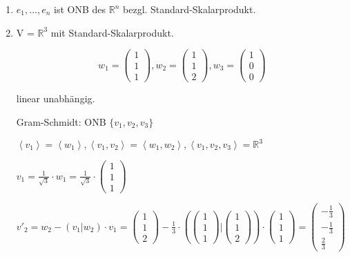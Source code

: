 \documentclass[a4paper, openany]{book}
\begin{document}
        \begin{enumerate}[label=(\alph*)]
          \item $e_1, ..., e_n$ ist ONB des $\mathbb{R}^n$ bezgl. Standard-Skalarprodukt.

          \item V = $\mathbb{R}^3$ mit Standard-Skalarprodukt.

          \[ w_1 = \begin{pmatrix}1 \\ 1 \\ 1 \end{pmatrix}, w_2 = \begin{pmatrix}1 \\ 1 \\ 2 \end{pmatrix}, w_3 = \begin{pmatrix}1 \\ 0 \\ 0 \end{pmatrix} \]

          linear unabhängig.

          Gram-Schmidt: ONB $\{v_1, v_2, v_3 \}$

          $\left \langle v_1 \right \rangle = \left \langle w_1 \right \rangle, \left \langle v_1, v_2 \right \rangle = \left \langle w_1, w_2 \right \rangle, \left \langle v_1, v_2, v_3 \right \rangle = \mathbb{R}^3$

          \par \medskip

          $v_1 = \frac{1}{\sqrt{3}} \cdot w_1 = \frac{1}{\sqrt{3}} \cdot \begin{pmatrix}1 \\ 1 \\ 1 \end{pmatrix}$

          \par \medskip

          $v'_2 = w_2 - (v_1 | w_2) \cdot v_1 = \begin{pmatrix}1 \\ 1 \\ 2 \end{pmatrix} - \frac{1}{3} \cdot (\begin{pmatrix}1 \\ 1 \\ 1 \end{pmatrix} | \begin{pmatrix}1 \\ 1 \\ 2 \end{pmatrix}) \cdot \begin{pmatrix}1 \\ 1 \\ 1 \end{pmatrix} = \begin{pmatrix}- \frac{1}{3} \\ - \frac{1}{3} \\ \frac{2}{3}\end{pmatrix}$


\end{enumerate}
\end{document}
